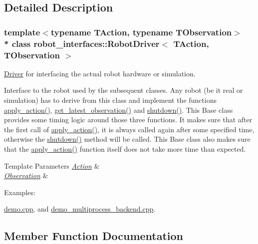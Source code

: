 \subsection{Detailed Description}
\subsubsection*{template$<$typename T\+Action, typename T\+Observation$>$\\*
class robot\+\_\+interfaces\+::\+Robot\+Driver$<$ T\+Action, T\+Observation $>$}

\hyperlink{classDriver}{Driver} for interfacing the actual robot hardware or simulation. 

Interface to the robot used by the subsequent classes. Any robot (be it real or simulation) has to derive from this class and implement the functions \hyperlink{classrobot__interfaces_1_1RobotDriver_a4294e522fcd12b38d69f7d53fae5d74a}{apply\+\_\+action()}, \hyperlink{classrobot__interfaces_1_1RobotDriver_ad13d4f4fdfe78bdde4fc964f07fa45e2}{get\+\_\+latest\+\_\+observation()} and \hyperlink{classrobot__interfaces_1_1RobotDriver_a3451fb8b15d2840b559f3ee858de01f8}{shutdown()}. This Base class provides some timing logic around those three functions. It makes sure that after the first call of \hyperlink{classrobot__interfaces_1_1RobotDriver_a4294e522fcd12b38d69f7d53fae5d74a}{apply\+\_\+action()}, it is always called again after some specified time, otherwise the \hyperlink{classrobot__interfaces_1_1RobotDriver_a3451fb8b15d2840b559f3ee858de01f8}{shutdown()} method will be called. This Base class also makes sure that the \hyperlink{classrobot__interfaces_1_1RobotDriver_a4294e522fcd12b38d69f7d53fae5d74a}{apply\+\_\+action()} function itself does not take more time than expected.


\begin{DoxyTemplParams}{Template Parameters}
{\em \hyperlink{classAction}{Action}} & \\
\hline
{\em \hyperlink{classObservation}{Observation}} & \\
\hline
\end{DoxyTemplParams}
\begin{Desc}
\item[Examples\+: ]\par
\hyperlink{demo_8cpp-example}{demo.\+cpp}, and \hyperlink{demo_multiprocess_backend_8cpp-example}{demo\+\_\+multiprocess\+\_\+backend.\+cpp}.\end{Desc}


\subsection{Member Function Documentation}
